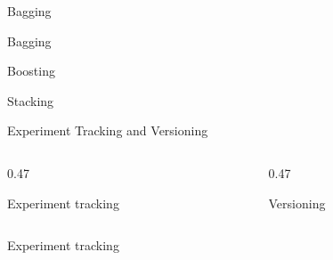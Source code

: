 \begin{frame}{Bagging}
  \begin{tddef}{Bagging}
  \end{tddef}
\end{frame}

\begin{frame}{Boosting}
  \begin{sidebody}
  \end{sidebody}
\end{frame}

\begin{frame}{Stacking}
  \begin{withmargin}
    \begin{tdmain}
    \end{tdmain}
    \begin{tdmargin}
    \end{tdmargin}
  \end{withmargin}
\end{frame}

\begin{frame}{Experiment Tracking and Versioning}
  \begin{columns}[T,onlytextwidth]
    \begin{column}{0.47\textwidth}
      \begin{tdblockt}[equal height group=etv]{Experiment tracking}
      \end{tdblockt}
    \end{column}
    \begin{column}{0.47\textwidth}
      \begin{tdblockt}[equal height group=etv]{Versioning}
      \end{tdblockt}
    \end{column}
  \end{columns}
\end{frame}

\begin{frame}{Experiment tracking}
  \begin{withmargin}
    \begin{tdmain}
    \end{tdmain}
    \begin{tdmargin}
    \end{tdmargin}
  \end{withmargin}
\end{frame}

